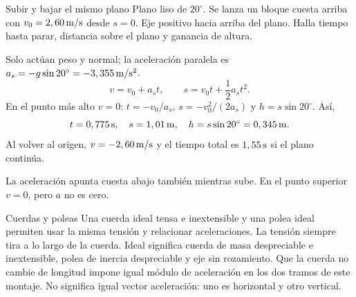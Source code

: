 \documentclass[11pt,a4paper]{article}
\begin{document}
\begin{examplebox}{Subir y bajar el mismo plano}
 Plano liso de $20^\circ$. Se lanza un bloque cuesta arriba con $v_0=2,60\,\mathrm{m/s}$ desde $s=0$. Eje positivo hacia arriba del plano. Halla tiempo hasta parar, distancia sobre el plano y ganancia de altura.
\solutionblock

 Solo act\'uan peso y normal; la aceleraci\'on paralela es $a_s=-g\sin20^\circ=-3,355\,\mathrm{m/s^2}$.
\[
v=v_0+a_st,\qquad s=v_0t+\frac12 a_st^2.
\]
 En el punto m\'as alto $v=0$:
$t=-v_0/a_s$, $s=-v_0^2/(2a_s)$ y $h=s\sin20^\circ$. As\'i,
\[
t=0,775\,\mathrm{s},\quad s=1,01\,\mathrm{m},\quad h=s\sin20^\circ=0,345\,\mathrm{m}.
\]
Al volver al origen, $v=-2,60\,\mathrm{m/s}$ y el tiempo total es $1,55\,\mathrm{s}$ si el plano contin\'ua.

 La aceleraci\'on apunta cuesta abajo tambi\'en mientras sube. En el punto superior $v=0$, pero $a$ no es cero.
\end{examplebox}

\begin{lessoncard}{Cuerdas y poleas}
Una cuerda ideal tensa e inextensible y una polea ideal permiten usar la misma tensi\'on y relacionar aceleraciones. La tensi\'on siempre tira a lo largo de la cuerda.
Ideal significa cuerda de masa despreciable e inextensible, polea de inercia
despreciable y eje sin rozamiento. Que la cuerda no cambie de longitud impone
igual m\'odulo de aceleraci\'on en los dos tramos de este montaje.
No significa igual vector aceleraci\'on: uno es horizontal y otro vertical.
\end{lessoncard}
\end{document}
